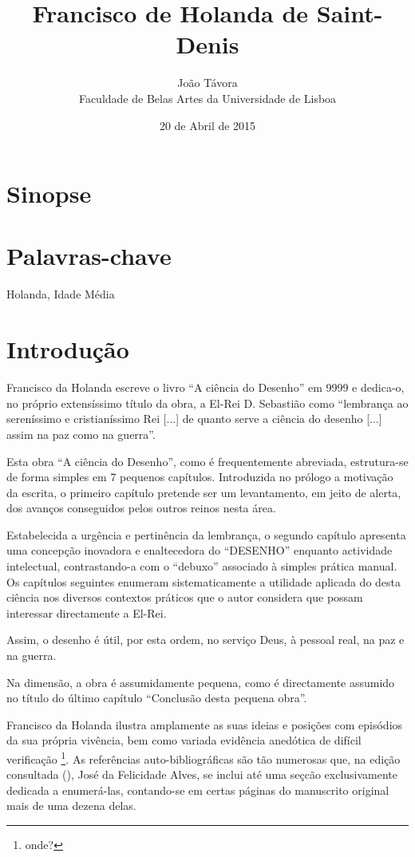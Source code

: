 \documentclass{article}
\title{Francisco de Holanda de Saint-Denis}
\date{20 de Abril de 2015}
\author{João Távora \\Faculdade de Belas Artes da Universidade de Lisboa}
\begin{document}
\maketitle

\section{Sinopse}

\section{Palavras-chave}

Holanda, Idade Média

\section{Introdução}

Francisco da Holanda escreve o livro ``A ciência do Desenho'' em 9999
e dedica-o, no próprio extensíssimo título da obra, a El-Rei
D. Sebastião como ``lembrança ao sereníssimo e cristianíssimo Rei
[...] de quanto serve a ciência do desenho [...]  assim na paz como na
guerra''. 

Esta obra ``A ciência do Desenho'', como é frequentemente abreviada,
estrutura-se de forma simples em 7 pequenos capítulos. Introduzida no
prólogo a motivação da escrita, o primeiro capítulo pretende ser um
levantamento, em jeito de alerta, dos avanços conseguidos pelos outros
reinos nesta área.

Estabelecida a urgência e pertinência da lembrança, o segundo capítulo
apresenta uma concepção inovadora e enaltecedora do ``DESENHO''
enquanto actividade intelectual, contrastando-a com o ``debuxo''
associado à simples prática manual. Os capítulos seguintes enumeram
sistematicamente a utilidade aplicada do desta ciência nos diversos
contextos práticos que o autor considera que possam interessar
directamente a El-Rei.

Assim, o desenho é útil, por esta ordem, no serviço Deus, à pessoal
real, na paz e na guerra. 

Na dimensão, a obra é assumidamente pequena, como é directamente
assumido no título do último capítulo ``Conclusão desta pequena
obra''.

Francisco da Holanda ilustra amplamente as suas ideias e posições com
episódios da sua própria vivência, bem como variada evidência
anedótica de difícil verificação \footnote{onde?}. As referências
auto-bibliográficas são tão numerosas que, na edição consultada
(\cite{holanda}), José da Felicidade Alves, se inclui até uma seçcão
exclusivamente dedicada a enumerá-las, contando-se em certas páginas
do manuscrito original mais de uma dezena delas.
\end{document}
